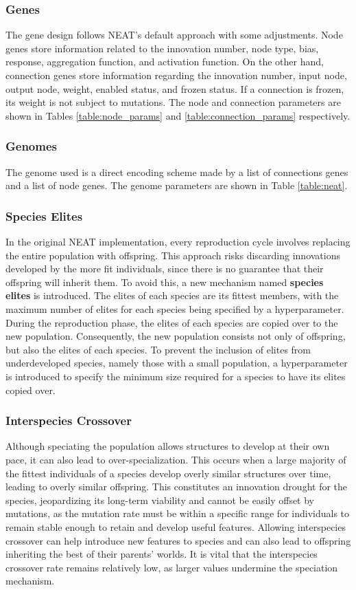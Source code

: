 \documentclass[letterpaper, 12pt]{article}
\begin{document}
\subsubsection*{Genes}
The gene design follows NEAT's default approach with some adjustments. Node genes store
information related to the innovation number, node type, bias, response, aggregation
function, and activation function. On the other hand, connection genes store information
regarding the innovation number, input node, output node, weight, enabled status, and
frozen status. If a connection is frozen, its weight is not subject to mutations. The
node and connection parameters are shown in Tables \ref{table:node_params} and
\ref{table:connection_params} respectively.

\subsubsection*{Genomes}
The genome used is a direct encoding scheme made by a list of connections genes and a
list of node genes. The genome parameters are shown in Table \ref{table:neat}.

\subsubsection*{Species Elites}
In the original NEAT implementation, every reproduction cycle involves replacing the
entire population with offspring. This approach risks discarding innovations developed
by the more fit individuals, since there is no guarantee that their offspring will
inherit them. To avoid this, a new mechanism named \textbf{species elites} is
introduced. The elites of each species are its fittest members, with the maximum number
of elites for each species being specified by a hyperparameter. During the reproduction
phase, the elites of each species are copied over to the new population. Consequently,
the new population consists not only of offspring, but also the elites of each species.
To prevent the inclusion of elites from underdeveloped species, namely those with a
small population, a hyperparameter is introduced to specify the minimum size required
for a species to have its elites copied over.

\subsubsection*{Interspecies Crossover}
Although speciating the population allows structures to develop at their own pace, it
can also lead to over-specialization. This occurs when a large majority of the fittest
individuals of a species develop overly similar structures over time, leading to overly
similar offspring. This constitutes an innovation drought for the species, jeopardizing
its long-term viability and cannot be easily offset by mutations, as the mutation rate
must be within a specific range for individuals to remain stable enough to retain and
develop useful features. Allowing interspecies crossover can help introduce new features
to species and can also lead to offspring inheriting the best of their parents' worlds.
It is vital that the interspecies crossover rate remains relatively low, as larger
values undermine the speciation mechanism.
\end{document}
